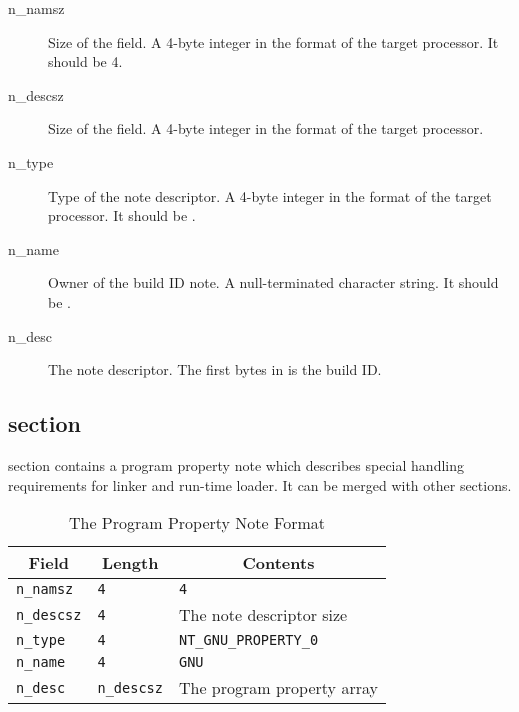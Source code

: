 \begin{description}
 \item[n_namsz] Size of the  field.  A 4-byte integer in the
   format of the target processor.  It should be 4.
 \item[n_descsz] Size of the  field.  A 4-byte integer in the
   format of the target processor.
 \item[n_type] Type of the note descriptor.  A 4-byte integer in the format
   of the target processor.  It should be .
 \item[n_name] Owner of the build ID note.  A null-terminated character
   string.  It should be .
 \item[n_desc] The note descriptor.  The first  bytes in
    is the build ID.
\end{description}

\subsection{ section}
\label{sec_property}

 section contains a program property note which
describes special handling requirements for linker and run-time loader.
It can be merged with other  sections.

\begin{table}[H]
\Hrule
 \caption{The Program Property Note Format}
 \label{format-property}
 \begin{center}
  \begin{tabular}[t]{l|l|l}
   \multicolumn{1}{c}{Field}
     & \multicolumn{1}{c}{Length}
       & \multicolumn{1}{c}{Contents} \\
   \hline
   \texttt{n_namsz} & \texttt{4} & \texttt{4} \\
   \texttt{n_descsz} & \texttt{4} & The note descriptor size \\
   \texttt{n_type} & \texttt{4} & \texttt{NT_GNU_PROPERTY_0} \\
   \texttt{n_name} & \texttt{4} & \texttt{GNU} \\
   \texttt{n_desc} & \texttt{n_descsz} & The program property array \\
  \end{tabular}
 \end{center}
\Hrule
\end{table}

